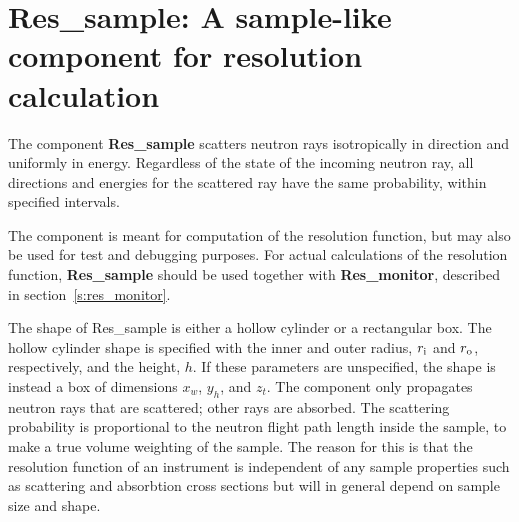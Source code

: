 \section{Res\_sample: A sample-like component for resolution calculation}
\label{s:res_sample}


The component \textbf{Res\_sample} scatters neutron rays isotropically
in direction and uniformly in energy.
Regardless of the state of the incoming neutron ray, 
all directions and energies for the scattered ray have the same probability,
within specified intervals. 

The component is meant
for computation of the resolution function, but may also be used
for test and debugging purposes. For actual calculations of the resolution
function, {\bf Res\_sample} should be used
together with \textbf{Res\_monitor}, described in
section~\ref{s:res_monitor}.

The shape of {\rm Res\_sample} is either a hollow cylinder
or a rectangular box. 
The hollow cylinder shape is
specified with the inner and outer radius, $r_{\rm i}$ and $r_{\rm o}$,
respectively, and the height, $h$.
If these parameters are unspecified,
the shape is instead a box of dimensions $x_w$, $y_h$, and $z_t$.
%
%
The component only propagates neutron rays that are scattered; 
other rays are absorbed. The scattering probability is proportional to the neutron
flight path length inside the sample, to make a true volume weighting
of the sample. The reason for this is that the resolution
function of an instrument is independent of any sample properties 
such as scattering and absorbtion cross sections but will in general
depend on sample size and shape.

